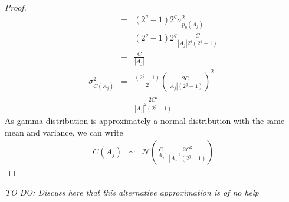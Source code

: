\begin{proof}
\begin{eqnarray*}
&=& (2^q-1)2^q\sigma_{p_{\eta}(A_j)}^2\\
&=& (2^q-1)2^q\frac{C}{|A_j|2^q(2^q-1)}\\
&=& \frac{C}{|A_j|}\\
\sigma_{C(A_j)}^2 &=& \frac{(2^q-1)}{2}\left(\frac{2C}{|A_j|(2^q-1)}\right)^2\\
&=& \frac{2C^2}{|A_j|^2(2^q -1)}
\end{eqnarray*}
As gamma distribution is approximately a normal distribution with the same mean and variance, we can write
\begin{eqnarray*}
C(A_j) &\sim & \mathcal{N}\left(\frac{C}{A_j},\frac{2C^2}{|A_j|^2(2^q -1)}\right)
\end{eqnarray*}
\end{proof}
\emph{\color{red}TO DO: Discuss here that this alternative approximation is of no help}
\fi

